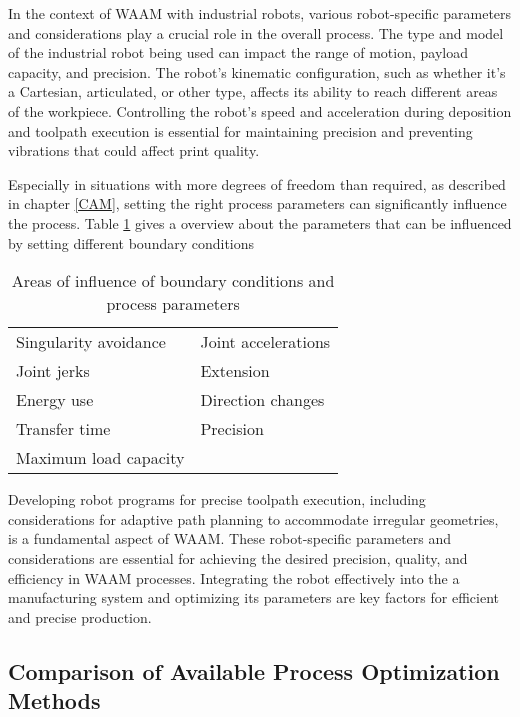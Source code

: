 \documentclass[ZLstudentexpose%
              ,optBiber%
              ,optEnglish%
              ,10pt
              ]{ZLlatex}%
\begin{document}
In the context of WAAM with industrial robots, various robot-specific parameters and considerations play a crucial role in the overall process. The type and model of the industrial robot being used can impact the range of motion, payload capacity, and precision. The robot's kinematic configuration, such as whether it's a Cartesian, articulated, or other type, affects its ability to reach different areas of the workpiece. Controlling the robot's speed and acceleration during deposition and toolpath execution is essential for maintaining precision and preventing vibrations that could affect print quality.

Especially in situations with more degrees of freedom than required, as described in chapter \ref{CAM}, setting the right process parameters can significantly influence the process.
Table \ref{parameter} gives a overview about the parameters that can be influenced by setting different boundary conditions

\begin{table} [h!]
\centering
\begin{tabular}{|l|l|}
\hline
\hline
Singularity avoidance & Joint accelerations\\
Joint jerks & Extension \\
Energy use & Direction changes\\
Transfer time & Precision\\
Maximum load capacity & \\
\hline
\hline

\end{tabular}

\label{parameter}
\caption{Areas of influence of boundary conditions and process parameters}

\end{table}

Developing robot programs for precise toolpath execution, including considerations for adaptive path planning to accommodate irregular geometries, is a fundamental aspect of WAAM.
These robot-specific parameters and considerations are essential for achieving the desired precision, quality, and efficiency in WAAM processes. Integrating the robot effectively into the a manufacturing system and optimizing its parameters are key factors for efficient and precise production.

\subsection{Comparison of Available Process Optimization Methods}
\end{document}
